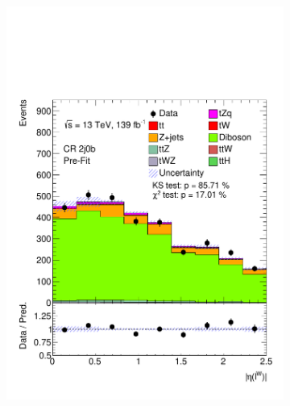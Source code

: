 \begin{figure}[h!]
\begin{subfigure}[b]{0.33\linewidth}
    \includegraphics[width=\linewidth]{ubonn-thesis/Chapters/Chapters_05/Figure/CR_VV/CR_2j0b_lepW_eta.pdf} 
  \end{subfigure} 
  \newline
  \begin{subfigure}[b]{0.33\linewidth}
    \centering

\end{subfigure}
\end{figure}
